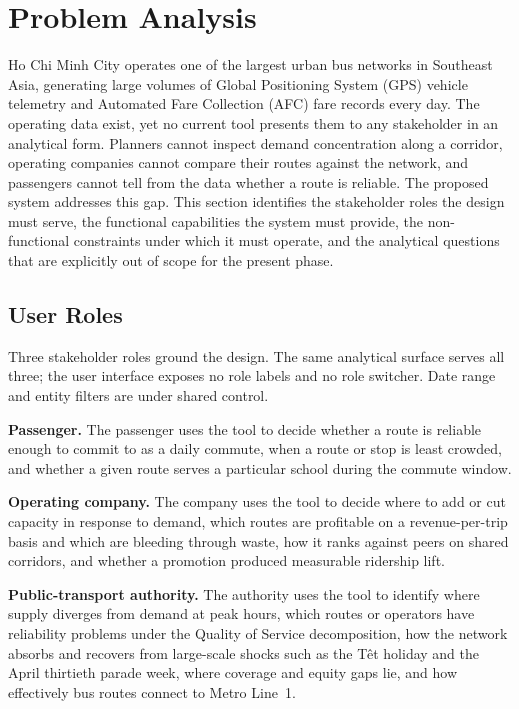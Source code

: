 \section{Problem Analysis}
\label{sec:solution:problem}

Ho Chi Minh City operates one of the largest urban bus networks in Southeast
Asia, generating large volumes of Global Positioning System (GPS) vehicle
telemetry and Automated Fare Collection (AFC) fare records every day. The
operating data exist, yet no current tool presents them to any stakeholder in
an analytical form. Planners cannot inspect demand concentration along a
corridor, operating companies cannot compare their routes against the network,
and passengers cannot tell from the data whether a route is reliable. The
proposed system addresses this gap. This section identifies the stakeholder
roles the design must serve, the functional capabilities the system must
provide, the non-functional constraints under which it must operate, and the
analytical questions that are explicitly out of scope for the present phase.

\subsection{User Roles}
\label{sec:solution:problem:roles}

Three stakeholder roles ground the design. The same analytical surface
serves all three; the user interface exposes no role labels and no role
switcher. Date range and entity filters are under shared control.

\noindent\textbf{Passenger.} The passenger uses the tool to decide whether a route is reliable enough to commit to as a daily commute, when a route or stop is least crowded, and whether a given route serves a particular school during the commute window.

\noindent\textbf{Operating company.} The company uses the tool to decide where to add or cut capacity in response to demand, which routes are profitable on a revenue-per-trip basis and which are bleeding through waste, how it ranks against peers on shared corridors, and whether a promotion produced measurable ridership lift.

\noindent\textbf{Public-transport authority.} The authority uses the tool to identify where supply diverges from demand at peak hours, which routes or operators have reliability problems under the Quality of Service decomposition, how the network absorbs and recovers from large-scale shocks such as the T\^et holiday and the April thirtieth parade week, where coverage and equity gaps lie, and how effectively bus routes connect to Metro Line~1.

